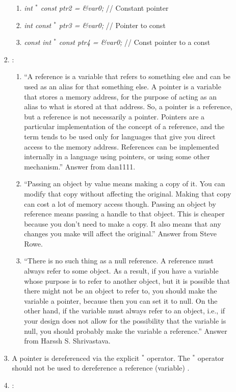\begin{enumerate}
\begin{enumerate}
\begin{enumerate}
\begin{enumerate}
			\item {\it int $^{\ast}$ const ptr2 = {\rm \&}var0;} // Constant pointer
			\item {\it int const $^{\ast}$ ptr3 = {\rm \&}var0;} // Pointer to const
			\item {\it const int $^{\ast}$ const ptr4 = {\rm \&}var0;} // Const pointer to a const
			\end{enumerate}
		\item \cite{Ozcan2013}: \vspace{-0.1cm}
			\begin{enumerate} \itemsep -1pt
			\item ``A reference is a variable that refers to something else and can be used as an alias for that something else. A pointer is a variable that stores a memory address, for the purpose of acting as an alias to what is stored at that address. So, a pointer is a reference, but a reference is not necessarily a pointer. Pointers are a particular implementation of the concept of a reference, and the term tends to be used only for languages that give you direct access to the memory address. References can be implemented internally in a language using pointers, or using some other mechanism.'' Answer from dan1111.
			\item ``Passing an object by value means making a copy of it. You can modify that copy without affecting the original. Making that copy can cost a lot of memory access though. Passing an object by reference means passing a handle to that object. This is cheaper because you don't need to make a copy. It also means that any changes you make will affect the original.'' Answer from Steve Rowe.
			\item ``There is no such thing as a null reference. A reference must always refer to some object. As a result, if you have a variable whose purpose is to refer to another object, but it is possible that there might not be an object to refer to, you should make the variable a pointer, because then you can set it to null. On the other hand, if the variable must always refer to an object, i.e., if your design does not allow for the possibility that the variable is null, you should probably make the variable a reference.'' Answer from Harssh S. Shrivastava.
			\end{enumerate}
		\item A pointer is dereferenced via the explicit $^{\ast}$ operator. The $^{\ast}$ operator should not be used to dereference a reference (variable) \cite{Saks2001}.
		\item \cite{Saks2001}: \vspace{-0.1cm}

\end{enumerate}
\end{enumerate}
\end{enumerate}
